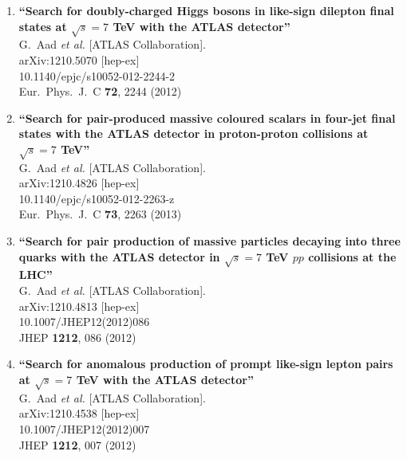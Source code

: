 \documentclass{article}
\begin{document}
\begin{enumerate}
\item%
{\bf ``Search for doubly-charged Higgs bosons in like-sign dilepton final states at $\sqrt{s}=7$ TeV with the ATLAS detector''}
  \\{}G.~Aad {\it et al.}  [ATLAS Collaboration].
  \\{}arXiv:1210.5070 [hep-ex]
    \\{}10.1140/epjc/s10052-012-2244-2
\\{}Eur.\ Phys.\ J.\ C {\bf 72}, 2244 (2012) %


\item%
{\bf ``Search for pair-produced massive coloured scalars in four-jet final states with the ATLAS detector in proton-proton collisions at $\sqrt{s}=7$ TeV''}
  \\{}G.~Aad {\it et al.}  [ATLAS Collaboration].
  \\{}arXiv:1210.4826 [hep-ex]
    \\{}10.1140/epjc/s10052-012-2263-z
\\{}Eur.\ Phys.\ J.\ C {\bf 73}, 2263 (2013) %


\item%
{\bf ``Search for pair production of massive particles decaying into three quarks with the ATLAS detector in $\sqrt{s}=7$ TeV $pp$ collisions at the LHC''}
  \\{}G.~Aad {\it et al.}  [ATLAS Collaboration].
  \\{}arXiv:1210.4813 [hep-ex]
    \\{}10.1007/JHEP12(2012)086
\\{}JHEP {\bf 1212}, 086 (2012) %


\item%
{\bf ``Search for anomalous production of prompt like-sign lepton pairs at $\sqrt{s}=7$ TeV with the ATLAS detector''}
  \\{}G.~Aad {\it et al.}  [ATLAS Collaboration].
  \\{}arXiv:1210.4538 [hep-ex]
    \\{}10.1007/JHEP12(2012)007
\\{}JHEP {\bf 1212}, 007 (2012) %



\end{enumerate}
\end{document}
